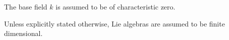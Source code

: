 
The base field \(k\) is assumed to be of characteristic zero.

Unless explicitly stated otherwise, Lie algebras are assumed to be finite dimensional.

